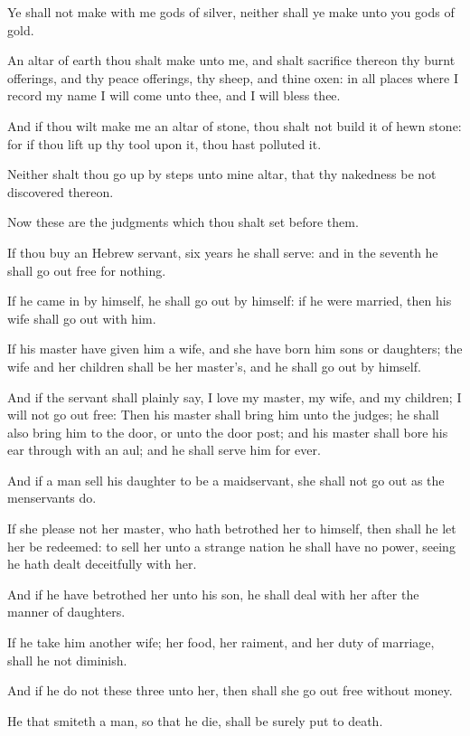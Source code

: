 \Verse Ye shall not make with me gods of silver, neither shall ye make unto you gods of gold.

\Verse An altar of earth thou shalt make unto me, and shalt sacrifice thereon thy burnt offerings, and thy peace offerings, thy sheep, and thine oxen: in all places where I record my name I will come unto thee, and I will bless thee.

\Verse And if thou wilt make me an altar of stone, thou shalt not build it of hewn stone: for if thou lift up thy tool upon it, thou hast polluted it.

\Verse Neither shalt thou go up by steps unto mine altar, that thy nakedness be not discovered thereon.

\Chapter
\Verse Now these are the judgments which thou shalt set before them.

\Verse If thou buy an Hebrew servant, six years he shall serve: and in the seventh he shall go out free for nothing.

\Verse If he came in by himself, he shall go out by himself: if he were married, then his wife shall go out with him.

\Verse If his master have given him a wife, and she have born him sons or daughters; the wife and her children shall be her master's, and he shall go out by himself.

\Verse And if the servant shall plainly say, I love my master, my wife, and my children; I will not go out free: \Verse Then his master shall bring him unto the judges; he shall also bring him to the door, or unto the door post; and his master shall bore his ear through with an aul; and he shall serve him for ever.

\Verse And if a man sell his daughter to be a maidservant, she shall not go out as the menservants do.

\Verse If she please not her master, who hath betrothed her to himself, then shall he let her be redeemed: to sell her unto a strange nation he shall have no power, seeing he hath dealt deceitfully with her.

\Verse And if he have betrothed her unto his son, he shall deal with her after the manner of daughters.

\Verse If he take him another wife; her food, her raiment, and her duty of marriage, shall he not diminish.

\Verse And if he do not these three unto her, then shall she go out free without money.

\Verse He that smiteth a man, so that he die, shall be surely put to death.

